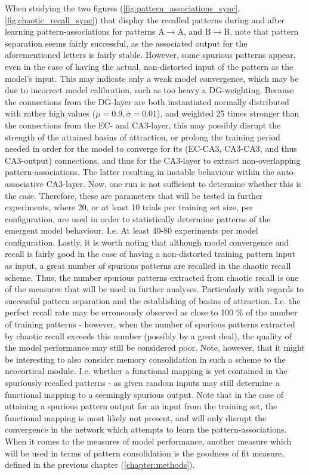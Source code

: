 When studying the two figures (\ref{fig:pattern_associations_sync}, \ref{fig:chaotic_recall_sync}) that display the recalled patterns during and after learning pattern-associations for patterns A$\rightarrow$A, and B$\rightarrow$B, note that pattern separation seems fairly successful, as the associated output for the aforementioned letters is fairly stable. However, some spurious patterns appear, even in the case of having the actual, non-distorted input of the pattern as the model's input. This may indicate only a weak model convergence, which may be due to incorrect model calibration, such as too heavy a DG-weighting. Because the connections from the DG-layer are both instantiated normally distributed with rather high values ($\mu=0.9, \sigma=0.01$), and weighted 25 times stronger than the connections from the EC- and CA3-layer, this may possibly disrupt the strength of the attained basins of attraction, or prolong the training period needed in order for the model to converge for its (EC-CA3, CA3-CA3, and thus CA3-output) connections, and thus for the CA3-layer to extract non-overlapping pattern-associations. The latter resulting in instable behaviour within the auto-associative CA3-layer. Now, one run is not sufficient to determine whether this is the case. Therefore, these are parameters that will be tested in further experiments, where 20, or at least 10 trials per training set size, per configuration, are used in order to statistically determine patterns of the emergent model behaviour. I.e. At least 40-80 experiments per model configuration.
Lastly, it is worth noting that although model convergence and recall is fairly good in the case of having a non-distorted training pattern input as input, a great number of spurious patterns are recalled in the chaotic recall scheme. Thus, the number spurious patterns extracted from chaotic recall is one of the measures that will be used in further analyses. Particularly with regards to successful pattern separation and the establishing of basins of attraction. I.e. the perfect recall rate may be erroneously observed as close to 100 \% of the number of training patterns - however, when the number of spurious patterns extracted by chaotic recall exceeds this number (possibly by a great deal), the quality of the model performance may still be considered poor. Note, however, that it might be interesting to also consider memory consolidation in such a scheme to the neocortical module. I.e. whether a functional mapping is yet contained in the spuriously recalled patterns - as given random inputs may still determine a functional mapping to a seemingly spurious output. Note that in the case of attaining a spurious pattern output for an input from the training set, the functional mapping is most likely not present, and will only disrupt the convergence in the network which attempts to learn the pattern-associations. When it comes to the measures of model performance, another measure which will be used in terms of pattern consolidation is the goodness of fit measure, defined in the previous chapter (\ref{chapter:methods}).

